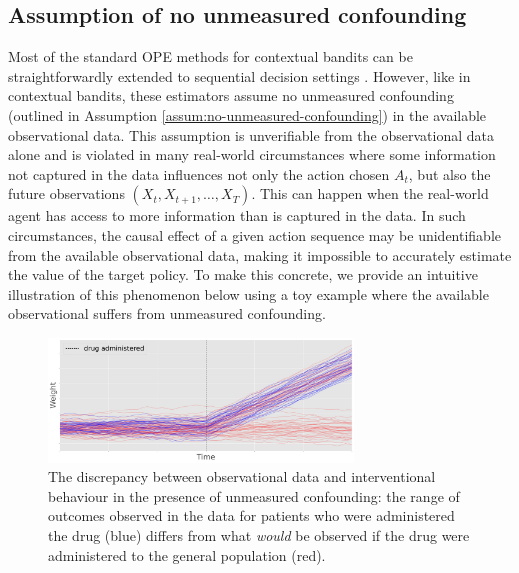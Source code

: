 \subsection{Assumption of no unmeasured confounding}
Most of the standard OPE methods for contextual bandits can be straightforwardly extended to sequential decision settings \citep{uehara2022reviewoffpolicyevaluationreinforcement}. 
However, like in contextual bandits, these estimators assume no unmeasured confounding (outlined in Assumption \ref{assum:no-unmeasured-confounding}) in the available observational data. This assumption is unverifiable from the observational data alone and is violated in many real-world circumstances where some information not captured in the data influences not only the action chosen $A_t$, but also the future observations $(X_t, X_{t+1}, \ldots, X_T)$. This can happen when the real-world agent has access to more information than is captured in the data. 
In such circumstances, the causal effect of a given action sequence may be unidentifiable from the available observational data, making it impossible to accurately estimate the value of the target policy.
To make this concrete, we provide an intuitive illustration of this phenomenon below using a toy example where the available observational suffers from unmeasured confounding.

\begin{figure}[t]
    \centering
    \includegraphics[height=3.3cm]{figures/causal/synthetic_example_newest2.pdf}
    \caption{The discrepancy between observational data and interventional behaviour in the presence of unmeasured confounding: the range of outcomes observed in the data for patients who were administered the drug (blue) differs from what \emph{would} be observed if the drug were administered to the general population (red).}
    \label{fig:syn_ex_intro}
\end{figure}

